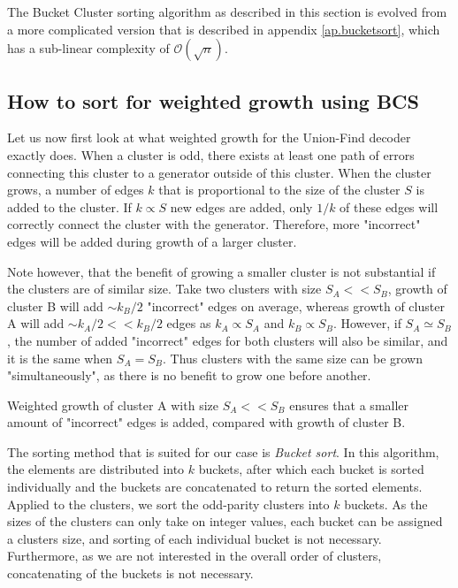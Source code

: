 The Bucket Cluster sorting algorithm as described in this section is evolved from a more complicated version that is described in appendix \ref{ap.bucketsort}, which has a sub-linear complexity of $\mathcal{O}(\sqrt{n})$.

\subsection{How to sort for weighted growth using BCS}

Let us now first look at what weighted growth for the Union-Find decoder exactly does. When a cluster is odd, there exists at least one path of errors connecting this cluster to a generator outside of this cluster. When the cluster grows, a number of edges $k$ that is proportional to the size of the cluster $S$ is added to the cluster. If $k \propto S$ new edges are added, only $1/k$ of these edges will correctly connect the cluster with the generator. Therefore, more "incorrect" edges will be added during growth of a larger cluster.

Note however, that the benefit of growing a smaller cluster is not substantial if the clusters are of similar size. Take two clusters with size $S_A <<S_B$, growth of cluster B will add $\sim k_B/2$ "incorrect" edges on average, whereas growth of cluster A will add $\sim k_A/2 << k_B/2$ edges as $k_A \propto S_A$ and $k_B \propto S_B$. However, if $S_A \simeq S_B$, the number of added "incorrect" edges for both clusters will also be similar, and it is the same when $S_A = S_B$. Thus clusters with the same size can be grown "simultaneously", as there is no benefit to grow one before another.

\begin{lemma}
  Weighted growth of cluster A with size $S_A << S_B$ ensures that a smaller amount of "incorrect" edges is added, compared with growth of cluster B.
\end{lemma}

The sorting method that is suited for our case is \emph{Bucket sort}. In this algorithm, the elements are distributed into $k$ buckets, after which each bucket is sorted individually and the buckets are concatenated to return the sorted elements. Applied to the clusters, we sort the odd-parity clusters into $k$ buckets. As the sizes of the clusters can only take on integer values, each bucket can be assigned a clusters size, and sorting of each individual bucket is not necessary. Furthermore, as we are not interested in the overall order of clusters, concatenating of the buckets is not necessary.

